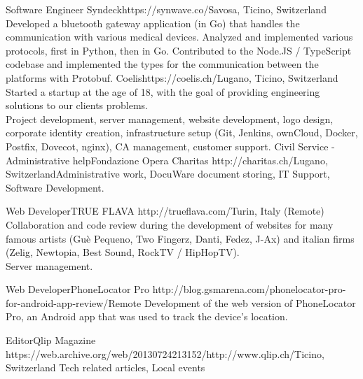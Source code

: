 \begin{CV}
        {Software Engineer}
        {Syndeck}{https://synwave.co/}{Savosa, Ticino, Switzerland}
        {Developed a bluetooth gateway application (in Go) that handles the communication with various
        medical devices. Analyzed and implemented various protocols, first in Python, then in Go.
        Contributed to the Node.JS / TypeScript codebase and implemented the types for the communication 
        between the platforms with Protobuf.}
        {Coelis}{https://coelis.ch/}{Lugano, Ticino, Switzerland}
        {Started a startup at the age of 18, with the goal of providing engineering solutions to our clients problems.\\
        Project development, server management, website development, logo design, 
        corporate identity creation, infrastructure setup (Git, Jenkins, ownCloud, Docker, Postfix, Dovecot, nginx),
        CA management, customer support.}
    {Civil Service - Administrative help}{Fondazione Opera Charitas}
    {http://charitas.ch/}{Lugano, Switzerland}{Administrative work, DocuWare document storing, IT Support, Software Development.}

    {Web Developer}{TRUE FLAVA}
    {http://trueflava.com/}{Turin, Italy (Remote)}{
        Collaboration and code review during the development of websites for many famous artists (Guè Pequeno,
        Two Fingerz, Danti, Fedez, J-Ax) and italian firms (Zelig, Newtopia, Best Sound, RockTV / HipHopTV).\\
        Server management.
    }

    {Web Developer}{PhoneLocator Pro}
    {http://blog.gsmarena.com/phonelocator-pro-for-android-app-review/}{Remote}
    {Development of the web version of PhoneLocator Pro, an Android app that was used 
    to track the device's location.}

    {Editor}{Qlip Magazine}
    {https://web.archive.org/web/20130724213152/http://www.qlip.ch/}{Ticino, Switzerland}
    {Tech related articles, Local events}
\end{CV}